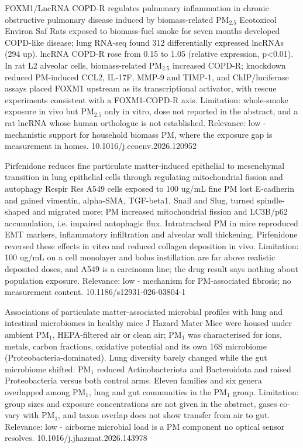 \documentclass[10pt]{article}
\begin{document}
{FOXM1/LncRNA COPD-R regulates pulmonary inflammation in chronic obstructive pulmonary disease induced by biomass-related PM$_{2.5}$}
{Ecotoxicol Environ Saf}
{Rats exposed to biomass-fuel smoke for seven months developed COPD-like disease; lung RNA-seq found 312 differentially expressed lncRNAs (294 up). lncRNA COPD-R rose from 0.15 to 1.05 (relative expression, p<0.01). In rat L2 alveolar cells, biomass-related PM$_{2.5}$ increased COPD-R; knockdown reduced PM-induced CCL2, IL-17F, MMP-9 and TIMP-1, and ChIP/luciferase assays placed FOXM1 upstream as its transcriptional activator, with rescue experiments consistent with a FOXM1-COPD-R axis. Limitation: whole-smoke exposure in vivo but PM$_{2.5}$ only in vitro, dose not reported in the abstract, and a rat lncRNA whose human orthologue is not established. Relevance: low - mechanistic support for household biomass PM, where the exposure gap is measurement in homes.}
{10.1016/j.ecoenv.2026.120952}

{Pirfenidone reduces fine particulate matter-induced epithelial to mesenchymal transition in lung epithelial cells through regulating mitochondrial fission and autophagy}
{Respir Res}
{A549 cells exposed to 100 ug/mL fine PM lost E-cadherin and gained vimentin, alpha-SMA, TGF-beta1, Snail and Slug, turned spindle-shaped and migrated more; PM increased mitochondrial fission and LC3B/p62 accumulation, i.e. impaired autophagic flux. Intratracheal PM in mice reproduced EMT markers, inflammatory infiltration and alveolar wall thickening. Pirfenidone reversed these effects in vitro and reduced collagen deposition in vivo. Limitation: 100 ug/mL on a cell monolayer and bolus instillation are far above realistic deposited doses, and A549 is a carcinoma line; the drug result says nothing about population exposure. Relevance: low - mechanism for PM-associated fibrosis; no measurement content.}
{10.1186/s12931-026-03804-1}

{Associations of particulate matter-associated microbial profiles with lung and intestinal microbiomes in healthy mice}
{J Hazard Mater}
{Mice were housed under ambient PM$_{1}$, HEPA-filtered air or clean air; PM$_{1}$ was characterised for ions, metals, carbon fractions, oxidative potential and its own 16S microbiome (Proteobacteria-dominated). Lung diversity barely changed while the gut microbiome shifted: PM$_{1}$ reduced Actinobacteriota and Bacteroidota and raised Proteobacteria versus both control arms. Eleven families and six genera overlapped among PM$_{1}$, lung and gut communities in the PM$_{1}$ group. Limitation: group sizes and exposure concentrations are not given in the abstract, gases co-vary with PM$_{1}$, and taxon overlap does not show transfer from air to gut. Relevance: low - airborne microbial load is a PM component no optical sensor resolves.}
{10.1016/j.jhazmat.2026.143978}
\end{document}
